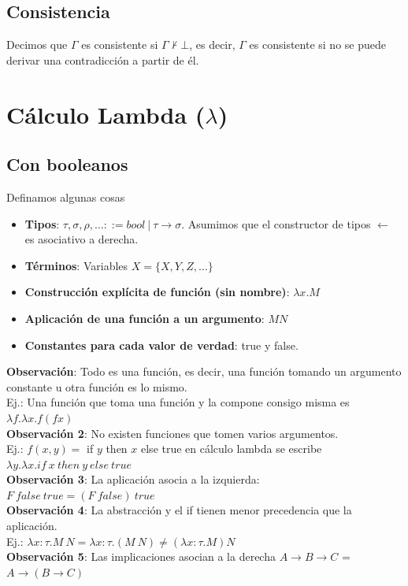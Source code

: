 \documentclass[10pt,a4paper]{article}
\begin{document}
\subsection*{Consistencia}
Decimos que $\Gamma$ es consistente si $\Gamma \nvdash \bot$, es decir, $\Gamma$ es consistente si no se puede derivar una contradicción a partir de él.
\section*{Cálculo Lambda ($\lambda$)}
\subsection*{Con booleanos}
Definamos algunas cosas 
\begin{itemize}
    \item \textbf{Tipos}: $\tau, \sigma, \rho, \dots ::= bool \ | \ \tau \rightarrow \sigma$. 
    Asumimos que el constructor de tipos $\leftarrow$ es asociativo a derecha.
    \item \textbf{Términos}: Variables $X = \{X, Y, Z, \dots\}$
    \item \textbf{Construcción explícita de función (sin nombre)}: $\lambda x . M$ 
    \item \textbf{Aplicación de una función a un argumento}: $MN$ 
    \item \textbf{Constantes para cada valor de verdad}: true y false.
\end{itemize}
\textbf{Observación}: Todo es una función, es decir, una función tomando un argumento constante u otra función es lo mismo. \\
Ej.: Una función que toma una función y la compone consigo misma es $\lambda f . \lambda x . f(fx)$ \\
\textbf{Observación 2}: No existen funciones que tomen varios argumentos. \\ 
Ej.: $f(x,y) = $ if $y$ then $x$ else true en cálculo lambda se escribe $\lambda y . \lambda x . if \ x \ then \ y \ else \ true$ \\
\textbf{Observación 3}: La aplicación asocia a la izquierda: $F \ false \ true = (F \ false) \ true$ \\
\textbf{Observación 4}: La abstracción y el if tienen menor precedencia que la aplicación. \\
Ej.: $\lambda x:\tau . M \ N = \lambda x : \tau . (M \ N) \neq (\lambda x : \tau . M) N$ \\
\textbf{Observación 5}: Las implicaciones asocian a la derecha $A \rightarrow B \rightarrow C$ = $A \rightarrow (B \rightarrow C)$
\end{document}
